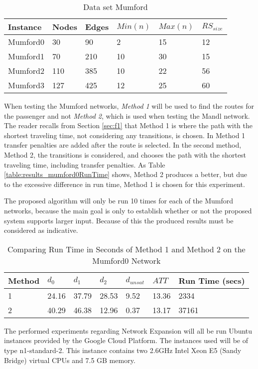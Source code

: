 \begin{table}[H]
	\centering
	\begin{tabular}{|l|l|l|l|l|l|}
    	\hline
    	Instance & Nodes&Edges & $Min(n)$ & $Max(n)$ & $RS_{size}$\\
    	\hline
   	    Mumford0 & 30&90 & 2&15 & 12 \\
   	    Mumford1 & 70&210 & 10&30 & 15 \\
   	    Mumford2 & 110&385 & 10&22 & 56 \\
   	    Mumford3 & 127&425 & 12&25 & 60 \\
   	    \hline
    \end{tabular}
    \caption{Data set Mumford}
    \label{table:dataSet_mumford}
\end{table}

When testing the Mumford networks, \textit{Method 1} will be used to find the routes for the passenger and not \textit{Method 2}, which is used when testing the Mandl network. The reader recalls from Section \vref{sec:f1} that Method 1 is where the path with the shortest traveling time, not considering any transitions, is chosen. In Method 1 transfer penalties are added after the route is selected. In the second method, Method 2, the transitions is considered, and chooses the path with the shortest traveling time, including transfer penalties. As Table \vref{table:results_mumford0RunTime} shows, Method 2 produces a better, but due to the excessive difference in run time, Method 1 is chosen for this experiment. 

The proposed algorithm will only be run 10 times for each of the Mumford networks, because the main goal is only to establish whether or not the proposed system supports larger input. Because of this the produced results must be considered as indicative. 

\begin{table}[H]
    \centering
    \begin{tabular}{|l|l|l|l|l|l|l|}
        \hline
        Method & $d_0$ & $d_1$ & $d_2$ & $d_{unsat}$ & $ATT$ & Run Time (secs) \\
        \hline
        1 & 24.16 & 37.79 & 28.53 & 9.52 & 13.36 & 2334 \\
        2 & 40.29 & 46.38 & 12.96 & 0.37 & 13.17 & 37161 \\
        \hline
    \end{tabular}
    \caption{Comparing Run Time in Seconds of Method 1 and Method 2 on the Mumford0 Network}
    \label{table:results_mumford0RunTime}
\end{table}

The performed experiments regarding Network Expansion will all be run Ubuntu instances provided by the Google Cloud Platform. The instances used will be of type n1-standard-2. This instance contains two 2.6GHz Intel Xeon E5 (Sandy Bridge) virtual CPUs and 7.5 GB memory\cite{website:google}.

